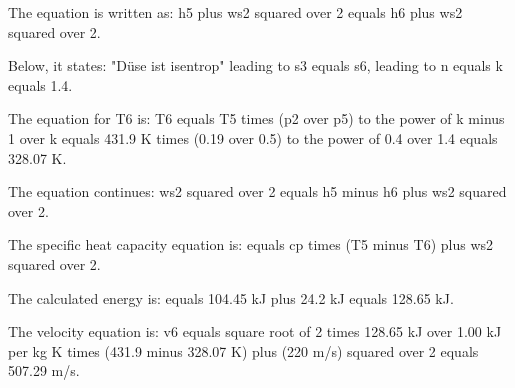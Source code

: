 The equation is written as:
h5 plus ws2 squared over 2 equals h6 plus ws2 squared over 2.

Below, it states:
"Düse ist isentrop" leading to s3 equals s6, leading to n equals k equals 1.4.

The equation for T6 is:
T6 equals T5 times (p2 over p5) to the power of k minus 1 over k equals 431.9 K times (0.19 over 0.5) to the power of 0.4 over 1.4 equals 328.07 K.

The equation continues:
ws2 squared over 2 equals h5 minus h6 plus ws2 squared over 2.

The specific heat capacity equation is:
equals cp times (T5 minus T6) plus ws2 squared over 2.

The calculated energy is:
equals 104.45 kJ plus 24.2 kJ equals 128.65 kJ.

The velocity equation is:
v6 equals square root of 2 times 128.65 kJ over 1.00 kJ per kg K times (431.9 minus 328.07 K) plus (220 m/s) squared over 2 equals 507.29 m/s.